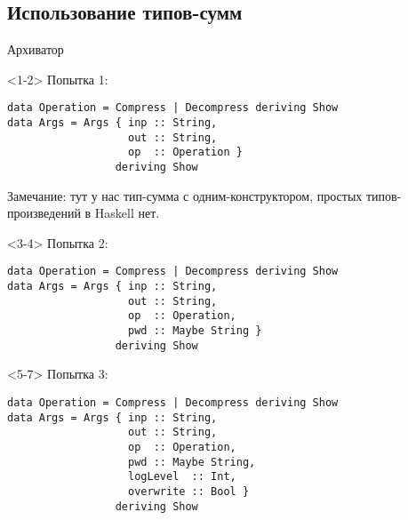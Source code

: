 \subsection{Использование типов-сумм}
\begin{frame}
\end{frame}

\begin{frame}[t,fragile]{Архиватор}

\begin{onlyenv}<1-2>
Попытка 1:
\begin{verbatim}
data Operation = Compress | Decompress deriving Show
data Args = Args { inp :: String,
                   out :: String,
                   op  :: Operation }
                 deriving Show
\end{verbatim}
Замечание: тут у нас тип-сумма с одним-конструктором, простых типов-произведений в Haskell нет.
\end{onlyenv}

\begin{onlyenv}<3-4>
Попытка 2:
\begin{verbatim}
data Operation = Compress | Decompress deriving Show
data Args = Args { inp :: String,
                   out :: String,
                   op  :: Operation,
                   pwd :: Maybe String }
                 deriving Show
\end{verbatim}
\end{onlyenv}

\begin{onlyenv}<5-7>
Попытка 3:
\begin{verbatim}
data Operation = Compress | Decompress deriving Show
data Args = Args { inp :: String,
                   out :: String,
                   op  :: Operation,
                   pwd :: Maybe String,
                   logLevel  :: Int,
                   overwrite :: Bool }
                 deriving Show
\end{verbatim}
\end{onlyenv}


\end{frame}
